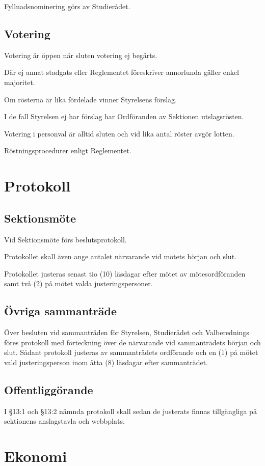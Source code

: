 \documentclass[10pt]{article}
\begin{document}
Fyllnadsnominering görs av Studierådet.

\subsection{Votering}
Votering är öppen när sluten votering ej begärts.

Där ej annat stadgats eller Reglementet föreskriver annorlunda gäller enkel
majoritet.

Om rösterna är lika fördelade vinner Styrelsens förslag.

I de fall Styrelsen ej har förslag har Ordföranden av Sektionen utslagsrösten.

Votering i personval är alltid sluten och vid lika antal röster avgör lotten.

Röstningsprocedurer enligt Reglementet.
\newpage

\section{Protokoll}
\subsection{Sektionsmöte}
Vid Sektionsmöte förs beslutsprotokoll.

Protokollet skall även ange antalet närvarande vid mötets början och slut.

Protokollet justeras senast tio (10) läsdagar efter mötet av
mötesordföranden samt två (2) på mötet valda justeringspersoner.

\subsection{Övriga sammanträde}
Över besluten vid sammanträden för Styrelsen, Studierådet och
Valberednings föres protokoll med förteckning över de närvarande vid
sammanträdets början och slut.
Sådant protokoll justeras av sammanträdets ordförande och en (1) på mötet
vald justeringsperson inom åtta (8) läsdagar efter sammanträdet.

\subsection{Offentliggörande}
I §13:1 och §13:2 nämnda protokoll skall sedan de justerats finnas
tillgängliga på sektionens anslagstavla och webbplats.
\newpage

\section{Ekonomi}
\end{document}
